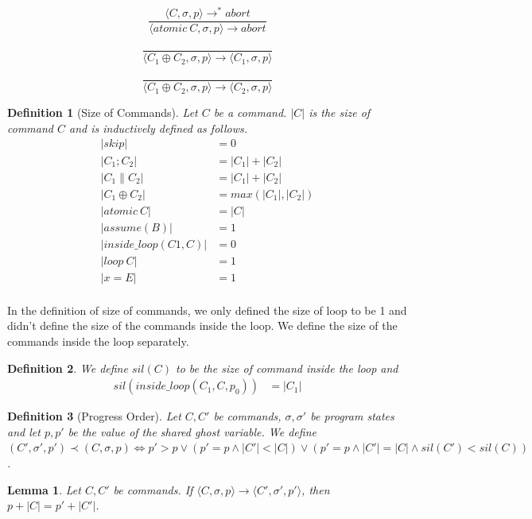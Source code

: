 \documentclass{article}
\newtheorem{defi}{Definition}
\newtheorem{lemma}[theorem]{Lemma}
\begin{document}
\[
\tag{\sc AtomAbort}
\frac{\langle C, \sigma, p \rangle \to^* abort}
{\langle atomic \  C, \sigma, p \rangle \to abort}
\]

\[
\tag{\sc Nondet1}
\frac{}
{\langle C_1 \oplus C_2, \sigma, p \rangle \to \langle C_1, \sigma, p \rangle}
\]

\[
\tag{\sc Nondet2}
\frac{}
{\langle C_1 \oplus C_2, \sigma, p \rangle \to \langle C_2, \sigma, p \rangle}
\]

\begin{defi}[Size of Commands]
Let $C$ be a command. $|C|$ is the size of command $C$ and is inductively defined as follows.
\begin{align*}
|skip| &= 0\\
|C_1; C_2| &= |C_1| + |C_2|\\
|C_1 \parallel C_2| &= |C_1| + |C_2|\\
|C_1 \oplus C_2| &= max(|C_1|, |C_2|)\\
|atomic \ C| &= |C|\\
|assume(B)| &= 1\\
|inside\_loop(C1, C)| &= 0\\
|loop \ C| &= 1\\
|x = E| &= 1\\
\end{align*}
\end{defi}

In the definition of size of commands, we only defined the size of loop to be 1 and didn't define the size of the commands inside the loop. We define the size of the commands inside the loop separately. 
\begin{defi}
We define $sil(C)$ to be the size of command inside the loop and 
\begin{align*}
sil(inside\_loop(C_1, C, p_0)) &= |C_1| 
\end{align*}
\end{defi}

\begin{defi}[Progress Order]
Let $C, C'$ be commands, $\sigma, \sigma'$ be program states and let $p, p'$ be the value of the shared ghost variable. We define $(C', \sigma', p') \prec (C, \sigma, p) \iff p' > p \lor (p' = p \land |C'| < |C|) \lor (p' = p \land |C'| = |C| \land sil(C') < sil(C))$.
\end{defi}

\begin{lemma}
Let $C, C'$ be commands. If $\langle C, \sigma, p \rangle \to \langle C', \sigma', p' \rangle$, then $p + |C| = p' + |C'|$.
\end{lemma}
\end{document}
